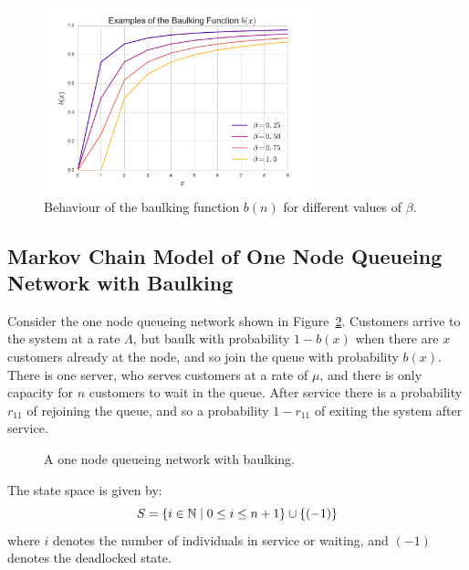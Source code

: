 \documentclass{article}
\begin{document}
\begin{figure}
    \begin{center}
        \includegraphics[width=0.7\textwidth]{img/examplebaulking.pdf}
    \end{center}
    \caption{Behaviour of the baulking function $b(n)$ for different values of $\beta$.}
    \label{fig:examplebaulkingfunctions}
\end{figure}


\subsection{Markov Chain Model of One Node Queueing Network with Baulking}

Consider the one node queueing network shown in Figure~\ref{fig:onenodenetwork_baulking}.
Customers arrive to the system at a rate $\Lambda$, but baulk with probability $1 - b(x)$ when there are $x$ customers already at the node, and so join the queue with probability $b(x)$. There is one server, who serves customers at a rate of $\mu$, and there is only capacity for $n$ customers to wait in the queue. After service there is a probability $r_{11}$ of rejoining the queue, and so a probability $1-r_{11}$ of exiting the system after service.

\begin{figure}
    \begin{center}
        
    \end{center}
    \caption{A one node queueing network with baulking.}
    \label{fig:onenodenetwork_baulking}
\end{figure}

The state space is given by:
        \[S = \{i\in\mathbb{N} \nonscript\; | \nonscript\; 0 \leq i \leq n + 1
        \}\cup\{(-1)\}\]
where \(i\) denotes the number of individuals in service or waiting, and $(-1)$ denotes the deadlocked state.
\end{document}
